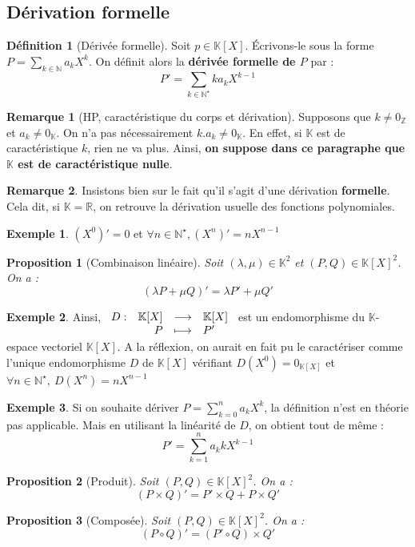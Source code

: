 \documentclass[french]{book}
\newcommand{\N}{\mathbb{N}}
\newcommand{\Z}{\mathbb{Z}}
\newcommand{\R}{\mathbb{R}}
\newcommand{\K}{\mathbb{K}}
\newcommand{\st}{^\star}
\theoremstyle{plain}
\newtheorem{prop}{Proposition}[chapter]
\theoremstyle{definition}
\newtheorem{dfn}{Définition}[chapter]
\newtheorem{exa}{Exemple}[chapter]
\newtheorem{rmq}{Remarque}[chapter]
\theoremstyle{remark}
\begin{document}
\subsection{Dérivation formelle}
\begin{dfn}[Dérivée formelle]
	Soit $p\in\K[X]$. Écrivons-le sous la forme $P=\sum_{k\in\N}a_kX^k$. On définit alors la \textbf{dérivée formelle de $P$} par : $$P'=\sum_{k\in\N\st}ka_kX^{k-1}$$
\end{dfn}
\begin{rmq}[HP, caractéristique du corps et dérivation]
	Supposons que $k\ne0_\Z$ et $a_k\ne0_\K$. On n'a pas nécessairement $k.a_k\ne0_\K$. En effet, si $\K$ est de caractéristique $k$, rien ne va plus. Ainsi, \textbf{on suppose dans ce paragraphe que $\K$ est de caractéristique nulle}.
\end{rmq}
\begin{rmq}
	Insistons bien sur le fait qu'il s'agit d'une dérivation \textbf{formelle}. Cela dit, si $\K=\R$, on retrouve la dérivation usuelle des fonctions polynomiales.
\end{rmq}
\begin{exa}
	$(X^0)'=0$ et $\forall n\in\N\st, (X^n)'=nX^{n-1}$
\end{exa}
\begin{prop}[Combinaison linéaire]
	Soit $(\lambda,\mu)\in\K^2$ et $(P,Q)\in\K[X]^2$. On a : $$(\lambda P+\mu Q)'=\lambda P'+\mu Q'$$
\end{prop}
\begin{exa}
	Ainsi, $\begin{array}[t]{lrcl}
		D: &\K[X] & \longrightarrow & \K[X] \\
		& P& \longmapsto & P'
	\end{array}$ est un endomorphisme du $\K$-espace vectoriel $\K[X]$. A la réflexion, on aurait en fait pu le caractériser comme l'unique endomorphisme $D$ de $\K[X]$ vérifiant $D(X^0)=0_{\K[X]}$ et $\forall n\in\N\st,\ D(X^n)=nX^{n-1}$
\end{exa}
\begin{exa}
	Si on souhaite dériver $P=\displaystyle\sum_{k=0}^{n}a_kX^k$, la définition n'est en théorie pas applicable. Mais en utilisant la linéarité de $D$, on obtient tout de même : $$P'=\sum_{k=1}^{n}a_kkX^{k-1}$$
\end{exa}
\begin{prop}[Produit]
	Soit $(P,Q)\in\K[X]^2$. On a : $$(P\times Q)'=P'\times Q+P\times Q'$$
\end{prop}
\begin{prop}[Composée]
	Soit $(P,Q)\in\K[X]^2$. On a : $$(P\circ Q)'=(P'\circ Q)\times Q'$$
\end{prop}
\end{document}
